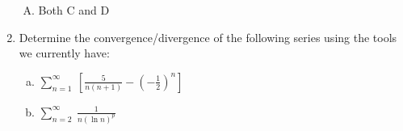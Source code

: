 \begin{enumerate}
\begin{enumerate}[A)]
\item Both C and D

\end{enumerate}

\vfill

\item Determine the convergence/divergence of the following series using the tools we currently have: \label{prob3}
\begin{enumerate}[a)]

%
%
%
%

\item \(\sum_{n=1}^\infty \ \left[\frac{5}{n(n+1)}-\left(-\frac{1}{2}\right)^n\right]\)\vfill

\item \(\sum_{n=2}^\infty \ \frac{1}{n(\ln n)^p}\)\vfill

\end{enumerate}

\end{enumerate}

\vspace*{-.25in}



